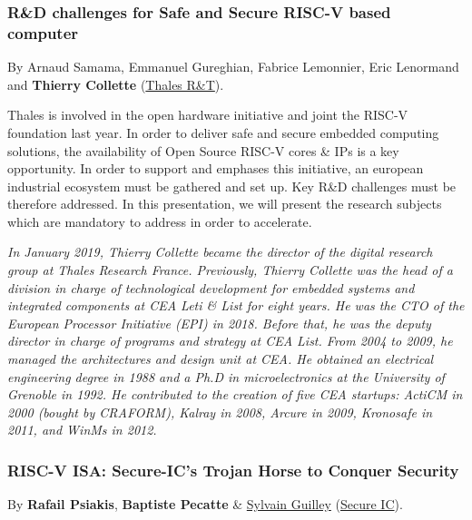 \documentclass[a4paper, 10pt]{article}
\begin{document}
{\subsubsection{R\&D challenges for Safe and Secure RISC-V based computer}
\label{sec:org81512d2}
By Arnaud Samama, Emmanuel Gureghian, Fabrice Lemonnier, Eric
Lenormand and \textbf{Thierry Collette} (\href{https://www.thalesgroup.com/en/global/innovation/research-and-technology}{Thales R\&T}).

Thales is involved in the open hardware initiative and joint the
RISC-V foundation last year. In order to deliver safe and secure
embedded computing solutions, the availability of Open Source RISC-V
cores \& IPs is a key opportunity. In order to support and emphases
this initiative, an european industrial ecosystem must be gathered and
set up. Key R\&D challenges must be therefore addressed. In this
presentation, we will present the research subjects which are
mandatory to address in order to accelerate.

\emph{\footnotesize In January 2019, Thierry Collette became the director of the digital research group at Thales Research France. Previously, Thierry Collette was the head of a division in charge of technological development for embedded systems and integrated components at CEA Leti \& List for eight years. He was the CTO of the European Processor Initiative (EPI) in 2018. Before that, he was the deputy director in charge of programs and strategy at CEA List. From 2004 to 2009, he managed the architectures and design unit at CEA. He obtained an electrical engineering degree in 1988 and a Ph.D in microelectronics at the University of Grenoble in 1992. He contributed to the creation of five CEA startups: ActiCM in 2000 (bought by CRAFORM), Kalray in 2008, Arcure in 2009, Kronosafe in 2011, and WinMs in 2012.}

\subsubsection{RISC-V ISA: Secure-IC's Trojan Horse to Conquer Security}
\label{sec:org80a67cf}
By \textbf{Rafail Psiakis}, \textbf{Baptiste Pecatte} \&
\href{https://perso.telecom-paristech.fr/guilley}{Sylvain Guilley}
(\href{http://www.secure-ic.com}{Secure IC}).

}
\end{document}
